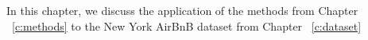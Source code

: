 In this chapter, we discuss the application of the methods from Chapter ~\ref{c:methods}
to the New York AirBnB dataset from Chapter  ~\ref{c:dataset}
